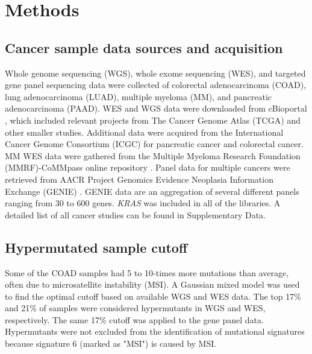 \documentclass[english, 10pt, letterpaper]{article}
\newcommand{\KRAS}{\emph{KRAS}}
\begin{document}

\section*{Methods}

\subsection*{Cancer sample data sources and acquisition}

Whole genome sequencing (WGS), whole exome sequencing (WES), and targeted gene panel sequencing data were collected of colorectal adenocarcinoma (COAD), lung adenocarcinoma (LUAD), multiple myeloma (MM), and pancreatic adenocarcinoma (PAAD).
WES and WGS data were downloaded from cBioportal \cite{Gao2013, Cerami2012}, which included relevant projects from The Cancer Genome Atlas (TCGA) \cite{CancerGenomeAtlasNetwork2012, CancerGenomeAtlasResearchNetwork2014, CancerGenomeAtlasResearchNetwork.Electronicaddress:andrew_aguirredfci.harvard.edu2017} and other smaller studies. 
Additional data were acquired from the International Cancer Genome Consortium (ICGC) for pancreatic cancer \cite{Scarlett2011} and colorectal cancer. 
MM WES data were gathered from the Multiple Myeloma Research Foundation (MMRF)-CoMMpass online repository \cite{Walker2019AAnalysis.}.
Panel data for multiple cancers were retrieved from AACR Project Genomics Evidence Neoplasia Information Exchange (GENIE) \cite{AACRProjectGENIEConsortium2017AACRConsortium.}.
GENIE data are an aggregation of several different panels ranging from 30 to 600 genes.
\KRAS{} was included in all of the libraries. 
A detailed list of all cancer studies can be found in Supplementary Data.


\subsection*{Hypermutated sample cutoff}

Some of the COAD samples had 5 to 10-times more mutations than average, often due to microsatellite instability (MSI). 
A Gaussian mixed model was used to find the optimal cutoff based on available WGS and WES data. 
The top 17\% and 21\% of samples were considered hypermutants in WGS and WES, respectively.
The same 17\% cutoff was applied to the gene panel data. 
Hypermutants were not excluded from the identification of mutational signatures because signature 6 (marked as "MSI") is caused by MSI.
\end{document}
